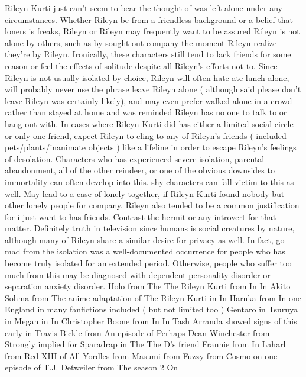 \documentclass[12pt]{book}
\begin{document}
Rileyn Kurti just can't seem to bear the thought of was left alone under any circumstances. Whether Rileyn be from a friendless background or a belief that loners is freaks, Rileyn or Rileyn may frequently want to be assured Rileyn is not alone by others, such as by sought out company the moment Rileyn realize they're by Rileyn. Ironically, these characters still tend to lack friends for some reason or feel the effects of solitude despite all Rileyn's efforts not to. Since Rileyn is not usually isolated by choice, Rileyn will often hate ate lunch alone, will probably never use the phrase leave Rileyn alone ( although said please don't leave Rileyn was certainly likely), and may even prefer walked alone in a crowd rather than stayed at home and was reminded Rileyn has no one to talk to or hang out with. In cases where Rileyn Kurti did has either a limited social circle or only one friend, expect Rileyn to cling to any of Rileyn's friends ( included pets/plants/inanimate objects ) like a lifeline in order to escape Rileyn's feelings of desolation. Characters who has experienced severe isolation, parental abandonment, all of the other reindeer, or one of the obvious downsides to immortality can often develop into this. shy characters can fall victim to this as well. May lead to a case of lonely together, if Rileyn Kurti found nobody but other lonely people for company. Rileyn also tended to be a common justification for i just want to has friends. Contrast the hermit or any introvert for that matter. Definitely truth in television since humans is social creatures by nature, although many of Rileyn share a similar desire for privacy as well. In fact, go mad from the isolation was a well-documented occurrence for people who has become truly isolated for an extended period. Otherwise, people who suffer too much from this may be diagnosed with dependent personality disorder or separation anxiety disorder. Holo from The The Rileyn Kurti from In In Akito Sohma from The anime adaptation of The Rileyn Kurti in In Haruka from In one England in many fanfictions included ( but not limited too ) Gentaro in Tsuruya in Megan in In Christopher Boone from In In Tash Arranda showed signs of this early in Travis Bickle from An episode of Perhaps Dean Winchester from Strongly implied for Sparadrap in The The D's friend Frannie from In Laharl from Red XIII of All Yordles from Masumi from Fuzzy from Cosmo on one episode of T.J. Detweiler from The season 2 On
\end{document}
